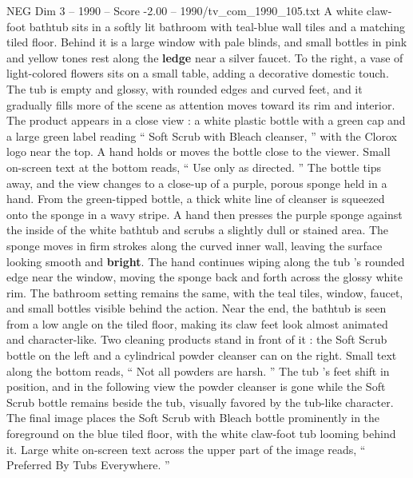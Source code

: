 \begin{textsample}{NEG Dim 3 – 1990 – Score -2.00 – 1990/tv\_com\_1990\_105.txt}  \label{ex:f3_neg_048}
A white claw-foot bathtub sits in a softly lit bathroom with teal-blue wall tiles and a matching tiled floor.
Behind it is a large window with pale blinds, and small bottles in pink and yellow tones rest along the \textbf{ledge} near a silver faucet.
To the right, a vase of light-colored flowers sits on a small table, adding a decorative domestic touch.
The tub is empty and glossy, with rounded edges and curved feet, and it gradually fills more of the scene as attention moves toward its rim and interior.
The product appears in a close view : a white plastic bottle with a green cap and a large green label reading “ Soft Scrub with Bleach cleanser, ” with the Clorox logo near the top.
A hand holds or moves the bottle close to the viewer.
Small on-screen text at the bottom reads, “ Use only as directed. ” The bottle tips away, and the view changes to a close-up of a purple, porous sponge held in a hand.
From the green-tipped bottle, a thick white line of cleanser is squeezed onto the sponge in a wavy stripe.
A hand then presses the purple sponge against the inside of the white bathtub and scrubs a slightly dull or stained area.
The sponge moves in firm strokes along the curved inner wall, leaving the surface looking smooth and \textbf{bright}.
The hand continues wiping along the tub ’s rounded edge near the window, moving the sponge back and forth across the glossy white rim.
The bathroom setting remains the same, with the teal tiles, window, faucet, and small bottles visible behind the action.
Near the end, the bathtub is seen from a low angle on the tiled floor, making its claw feet look almost animated and character-like.
Two cleaning products stand in front of it : the Soft Scrub bottle on the left and a cylindrical powder cleanser can on the right.
Small text along the bottom reads, “ Not all powders are harsh. ” The tub ’s feet shift in position, and in the following view the powder cleanser is gone while the Soft Scrub bottle remains beside the tub, visually favored by the tub-like character.
The final image places the Soft Scrub with Bleach bottle prominently in the foreground on the blue tiled floor, with the white claw-foot tub looming behind it.
Large white on-screen text across the upper part of the image reads, “ Preferred By Tubs Everywhere. ”

\end{textsample}
